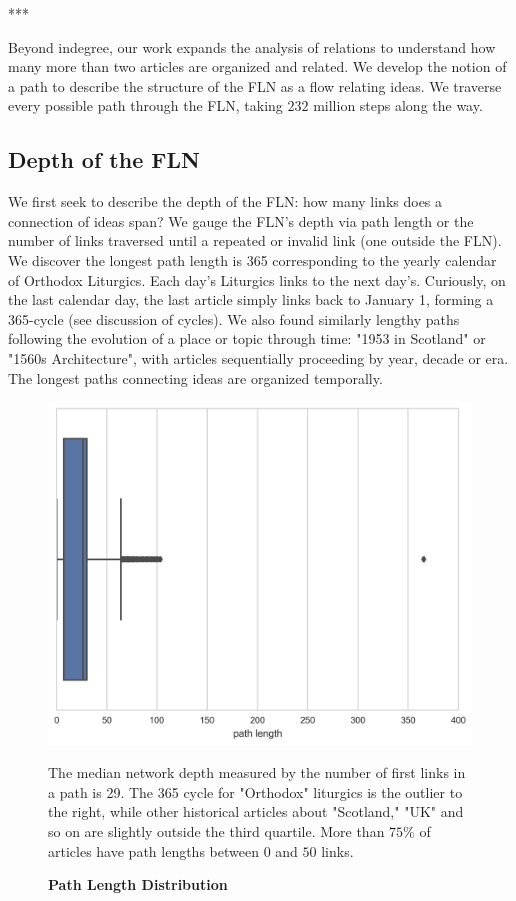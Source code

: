 \documentclass[pre,twocolumn,twoside,superscriptaddress,floatfix, aps, 10pt]{revtex4-1}
\begin{document}
\centerline{***}

Beyond indegree, our work expands the analysis of relations to understand 
how many more than two articles are organized and related. 
We develop the notion of a path to describe the structure of the FLN as a 
flow relating ideas. We traverse every possible path through the FLN, taking 
$232$ million steps along the way.


\subsection{Depth of the FLN}

We first seek to describe the depth of the FLN: how many links does a 
connection of ideas span? We gauge the FLN's depth via path length or the number of links traversed until a repeated or invalid link (one outside the FLN). 
We discover the longest path length is 365
corresponding to the yearly calendar of Orthodox Liturgics.
Each day's Liturgics links to the next day's. Curiously, on the last calendar day, the last article simply links back to January 1, forming a 365-cycle 
(see discussion of cycles).
We also found similarly lengthy paths following the evolution of a place or topic through time: 
"1953 in Scotland" or "1560s Architecture", with articles sequentially proceeding by year, decade or era.
The longest paths connecting ideas are organized temporally.

\begin{figure}[tp!]
  \centering	
  \includegraphics[width=\columnwidth]{graphics/path_lengths_boxplot.png}
  \caption{
    \textbf{Path Length Distribution}
  }
  The median network depth measured by the number of first links in a path
  is 29. The 365 cycle for "Orthodox" liturgics is the outlier to the right, while
  other historical articles about "Scotland," "UK" and so on are slightly outside
  the third quartile. More than $75\%$ of articles have path lengths between 
  $0$ and $50$ links.

  \label{fig:Path Length Distribution}
\end{figure}
\end{document}
